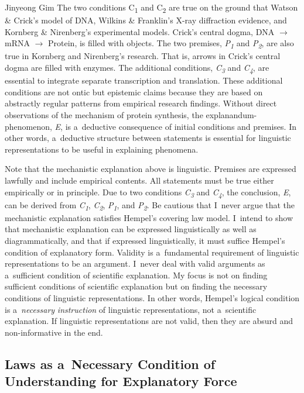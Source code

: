 \begin{artengenv}{Jinyeong Gim}
The two conditions C\textsubscript{1} and C\textsubscript{2} are true on the ground that Watson \& Crick's model of DNA, Wilkins \& Franklin's X-ray diffraction evidence, and Kornberg \& Nirenberg's experimental models. Crick's central dogma, DNA $\to$ mRNA $\to$ Protein, is filled with objects. The two premises, \textit{P}\textit{\textsubscript{1}} and \textit{P}\textit{\textsubscript{2}}, are also true in Kornberg and Nirenberg's research. That is, arrows in Crick's central dogma are filled with enzymes. The additional conditions, \textit{C}\textit{\textsubscript{3}} and \textit{C}\textit{\textsubscript{4}}, are essential to integrate separate transcription and translation. These additional conditions are not ontic but epistemic claims because they are based on abstractly regular patterns from empirical research findings. Without direct observations of the mechanism of protein synthesis, the explanandum-phenomenon, \textit{E}, is a~deductive consequence of initial conditions and premises. In other words, a~deductive structure between statements is essential for linguistic representations to be useful in explaining phenomena.

Note that the mechanistic explanation above is linguistic. Premises are expressed lawfully and include empirical contents. All statements must be true either empirically or in principle. Due to two conditions \textit{C}\textit{\textsubscript{3}} and \textit{C}\textit{\textsubscript{4}}, the conclusion, \textit{E}, can be derived from \textit{C}\textit{\textsubscript{1}}, \textit{C}\textit{\textsubscript{2}}, \textit{P}\textit{\textsubscript{1}}, and \textit{P}\textit{\textsubscript{2}}. Be cautious that I~never argue that the mechanistic explanation satisfies Hempel's covering law model. I~intend to show that mechanistic explanation can be expressed linguistically as well as diagrammatically, and that if expressed linguistically, it must suffice Hempel's condition of explanatory form. Validity is a~fundamental requirement of linguistic representations to be an argument. I~never deal with valid arguments as a~sufficient condition of scientific explanation. My focus is not on finding sufficient conditions of scientific explanation but on finding the necessary conditions of linguistic representations. In other words, Hempel's logical condition is a~\textit{necessary} \textit{instruction} of linguistic representations, not a~scientific explanation. If linguistic representations are not valid, then they are absurd and non-informative in the end.

\subsection{Laws as a~Necessary Condition of Understanding for Explanatory Force}


\end{artengenv}
